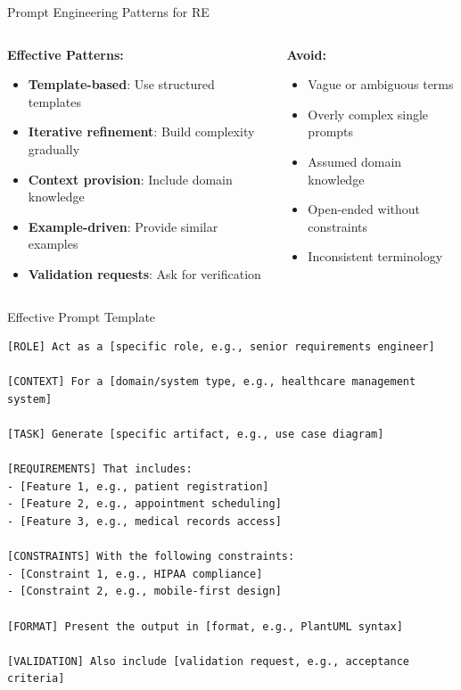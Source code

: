 \documentclass{beamer}
\begin{document}
\begin{frame}{Prompt Engineering Patterns for RE}
    \begin{columns}
        \begin{column}{0.5\textwidth}
            \textbf{Effective Patterns:}
            \begin{itemize}
                \item \textbf{Template-based}: Use structured templates
                \item \textbf{Iterative refinement}: Build complexity gradually
                \item \textbf{Context provision}: Include domain knowledge
                \item \textbf{Example-driven}: Provide similar examples
                \item \textbf{Validation requests}: Ask for verification
            \end{itemize}
        \end{column}
        \begin{column}{0.5\textwidth}
            \textbf{Avoid:}
            \begin{itemize}
                \item Vague or ambiguous terms
                \item Overly complex single prompts
                \item Assumed domain knowledge
                \item Open-ended without constraints
                \item Inconsistent terminology
            \end{itemize}
        \end{column}
    \end{columns}
\end{frame}

\begin{frame}[fragile]{Effective Prompt Template}
    \lstset{style=code}
    \begin{lstlisting}[caption={Structured Prompt Template for RE}]
[ROLE] Act as a [specific role, e.g., senior requirements engineer]

[CONTEXT] For a [domain/system type, e.g., healthcare management system]

[TASK] Generate [specific artifact, e.g., use case diagram]

[REQUIREMENTS] That includes:
- [Feature 1, e.g., patient registration]
- [Feature 2, e.g., appointment scheduling]
- [Feature 3, e.g., medical records access]

[CONSTRAINTS] With the following constraints:
- [Constraint 1, e.g., HIPAA compliance]
- [Constraint 2, e.g., mobile-first design]

[FORMAT] Present the output in [format, e.g., PlantUML syntax]

[VALIDATION] Also include [validation request, e.g., acceptance criteria]
    \end{lstlisting}
\end{frame}
\end{document}
